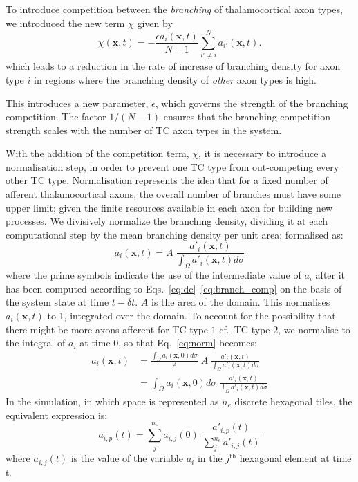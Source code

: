 \documentclass[a4paper,11pt]{article}
\newcommand{\e}{\emph}
\newcommand{\mb}[1]{\mathbf{#1}}
\begin{document}
To introduce competition between the \emph{branching} of thalamocortical axon
types, we introduced the new term $\chi$ given by
%
\begin{equation} \label{eq:branch_comp}
\chi(\mb{x}, t) = - \frac{\epsilon  a_i(\mb{x}, t)}{N-1} \sum_{i' \ne i}^{N} a_{i'}(\mb{x}, t).
\end{equation}
%
which leads to a reduction in the rate of increase of branching density for
axon type $i$ in regions where the branching density of \e{other} axon types
is high.

This introduces a new parameter, $\epsilon$, which governs the strength of the
branching competition. The factor $1/(N-1)$ ensures that the branching
competition strength scales with the number of TC axon types in the system.

With the addition of the competition term, $\chi$, it is necessary to
introduce a normalisation step, in order to prevent one TC type from
out-competing every other TC type. Normalisation represents the idea that for
a fixed number of afferent thalamocortical axons, the overall number of
branches must have some upper limit; given the finite resources available in
each axon for building new processes. We divisively normalize the branching
density, dividing it at each computational step by the mean branching density
per unit area; formalised as:
%
\begin{equation} \label{eq:norm}
a_i(\mathbf{x}, t) = A \; \frac {a'_i(\mathbf{x}, t)} {\int_\Omega a'_i(\mathbf{x}, t) d\sigma}
\end{equation}
%
where the prime symbols indicate the use of the intermediate value of $a_i$
after it has been computed according to Eqs.~\ref{eq:dc}--\ref{eq:branch_comp}
on the basis of the system state at time $t-{\delta}t$. $A$ is the area of the
domain. This normalises $a_i(\mathbf{x}, t)$ to 1, integrated over the domain. To
account for the possibility that there might be more axons afferent for TC
type $1$ cf.~TC type $2$, we normalise to the integral of $a_i$ at time 0, so
that Eq.~\ref{eq:norm} becomes:
%
\begin{equation} \label{eq:norm_time0}
\begin{split}
a_i(\mathbf{x}, t) & =
\frac{\int_\Omega  a_i(\mathbf{x}, 0) d\sigma}{A} \; A \; \frac {a'_i(\mathbf{x}, t)} {\int_\Omega
  a'_i(\mathbf{x}, t) d\sigma} \\
%
& = \int_\Omega  a_i(\mathbf{x}, 0) d\sigma \; \frac {a'_i(\mathbf{x}, t)} {\int_\Omega
  a'_i(\mathbf{x}, t) d\sigma}
\end{split}
\end{equation}
%
In the simulation, in which space is represented as $n_e$ discrete
hexagonal tiles, the equivalent expression is:
%
\begin{equation} \label{eq:norm_discrete}
  {a_{i,p}}(t) = \textstyle \sum_j^{n_e} a_{i,j}(0) \; \frac {a'_{i,p}(t)}
  {\textstyle \sum_j^{n_e} a'_{i,j}(t) }
\end{equation}
%
where $a_{i,j}(t)$ is the value of the variable $a_i$ in the $j^{\mathrm{th}}$
hexagonal element at time t.
\end{document}
